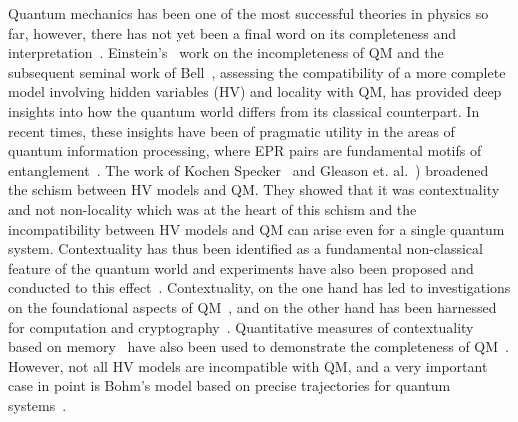 \documentclass[british,aps,prl,superscriptaddress,nofootinbib,times,reprint]{revtex4-1}
\theoremstyle{plain}
\theoremstyle{plain}
\theoremstyle{definition}
\theoremstyle{remark}
\theoremstyle{remark}
\theoremstyle{remark}
\theoremstyle{plain}
\theoremstyle{plain}
\theoremstyle{plain}
\theoremstyle{definition}
\theoremstyle{definition}
\begin{document}
Quantum mechanics has been one of the most
successful theories in physics so far, however,
there has not yet been a final word on its
completeness and interpretation~\cite{??}.
Einstein's~\cite{EinsteinEPR} work on the
incompleteness of QM and the subsequent seminal
work of Bell~\cite{Bell1964}, assessing the
compatibility of a more complete model involving
hidden variables (HV) and locality with QM, has
provided deep insights into  how the quantum world
differs from its classical counterpart.  In recent
times, these insights have been of pragmatic
utility in the areas of quantum information
processing, where EPR pairs are fundamental motifs
of entanglement~\cite{Ekert,PironioRndmnssCrtfcn}.
The work of  Kochen Specker~\cite{KochenSpecker}
and Gleason et.
al.~\cite{Gleason,BellOnHiddenVariables,Peres,Mermin})
broadened the schism between  HV models and QM.
They showed that it was contextuality and not
non-locality which was at the heart of this schism
and the incompatibility between HV models and QM
can arise even for a single quantum system.
Contextuality has thus been identified as a
fundamental non-classical feature of the quantum
world and experiments have also been proposed and
conducted to this effect~\cite{SimonContExpProp,
HuangContExp,YangContExp,HasegawaContExp}.
Contextuality, on the one hand has led to
investigations on the foundational aspects of
QM~\cite{PawelCntxClsscl,?????}, and on the other
hand has been harnessed for computation and
cryptography~\cite{HowardCntxCmptn,CabelloCntxScrt,??}.
Quantitative measures of contextuality based on
memory~\cite{MatthiasCntxMmry} have also been used
to demonstrate the completeness of
QM~\cite{CabelloMmryQM}.  However, not all HV
models are incompatible with QM, and a very
important case in point is  Bohm's model based on
precise trajectories for quantum
systems~\cite{Bohm1,Bohm2}. 
\end{document}

